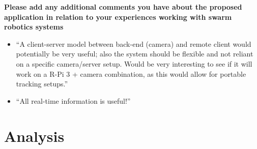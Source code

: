 \vspace{1cm}

\textbf{Please add any additional comments you have about the proposed application in relation to your experiences working with swarm robotics systems}

\begin{itemize}
\item ``A client-server model between back-end (camera) and remote client would potentially be very useful; also the system should be flexible and not reliant on a specific camera/server setup. Would be very interesting to see if it will work on a R-Pi 3 + camera combination, as this would allow for portable tracking setups.''
\item ``All real-time information is useful!''
\end{itemize}


\section{Analysis}


